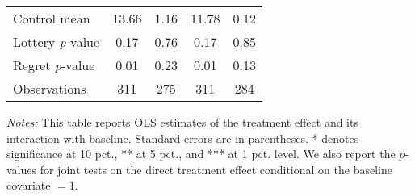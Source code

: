 \begin{table}[htbp]
{\begin{threeparttable}
\begin{tabular}{l*{4}{c}}
Control mean    &    13.66         &     1.16         &    11.78         &     0.12         \\
Lottery \emph{p}-value&     0.17         &     0.76         &     0.17         &     0.85         \\
Regret \emph{p}-value&     0.01         &     0.23         &     0.01         &     0.13         \\
Observations    &      311         &      275         &      311         &      284         \\
\bottomrule \end{tabular} \begin{tablenotes}[flushleft] \footnotesize \item \emph{Notes:} This table reports OLS estimates of the treatment effect and its interaction with baseline. Standard errors are in parentheses. * denotes significance at 10 pct., ** at 5 pct., and *** at 1 pct. level. We also report the \(p\)-values for joint tests on the direct treatment effect conditional on the baseline covariate $= 1$. \end{tablenotes} \end{threeparttable} } \end{table}

